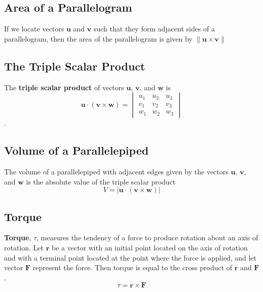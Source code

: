 \documentclass{article}
\begin{document}
\subsection*{Area of a Parallelogram}
If we locate vectors $\mathbf{u}$ and $\mathbf{v}$ such that they form adjacent sides of a parallelogram, then the area of the parallelogram is given by $\|\mathbf{u}\times\mathbf{v}\|$

\subsection*{The Triple Scalar Product}
The \textbf{triple scalar product} of vectors $\mathbf{u}$, $\mathbf{v}$, and $\mathbf{w}$ is
\[\mathbf{u}\cdot (\mathbf{v}\times\mathbf{w})=\begin{vmatrix}
    u_1 & u_2 & u_3 \\
    v_1 & v_2 & v_3 \\
    w_1 & w_2 & w_3
\end{vmatrix}\].

\subsection*{Volume of a Parallelepiped}

The volume of a parallelepiped with adjacent edges given by the vectors $\mathbf{u}$, $\mathbf{v}$, and $\mathbf{w}$ is the absolute value of the triple scalar product
\[V=|\mathbf{u}\cdot (\mathbf{v}\times\mathbf{w})|\]

\subsection*{Torque}
\textbf{Torque}, $\tau$, measures the tendency of a force to produce rotation about an axis of rotation. Let $\mathbf{r}$ be a vector with an initial point located on the axis of rotation and with a terminal point located at the point where the force is applied, and let vector $\mathbf{F}$ represent the force. Then torque is equal to the cross product of $\mathbf{r}$ and $\mathbf{F}$.
\[\tau = \mathbf{r}\times\mathbf{F}\]
\end{document}
